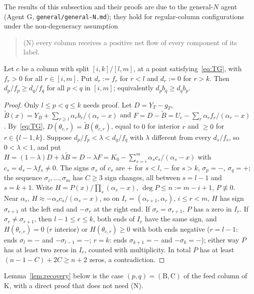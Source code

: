 \documentclass[11pt,a4paper]{report}
\begin{document}
The results of this subsection and their proofs are due to the general-$N$ agent (Agent G,
\texttt{general/general-N.md}); they hold for regular-column configurations under the non-degeneracy assumption
\begin{quote}
(N) every column receives a positive net flow of every component of its label.
\end{quote}

\begin{lemma}\label{lem:G1}
Let $c$ be a column with split $[i,k]/[l,m]$, at a point satisfying~\eqref{eq:TG}, with $f_r>0$ for all $r\in[i,m]$.
Put $d_r:=f_r$ for $r<l$ and $d_r:=0$ for $r>k$. Then $d_p/f_p\ge d_q/f_q$ for all $p<q$ in $[i,m]$; equivalently
$d_pb_q\ge d_qb_p$.
\end{lemma}
\begin{proof}
Only $l\le p<q\le k$ needs proof. Let $D=Y_T-g_T$, $\tilde B(x)=Y_B+\sum_{r\ge l}\alpha_rb_r/(\alpha_r-x)$ and
$F=D-\tilde B=U_c-\sum_r\alpha_rf_r/(\alpha_r-x)$. By~\eqref{eq:TG}, $D(\theta_{c,r})=\tilde B(\theta_{c,r})$, equal to $0$
for interior $r$ and $\ge0$ for $r\in\{l-1,k\}$. Suppose $d_p/f_p<\lambda<d_q/f_q$ with $\lambda$ different from every
$d_s/f_s$, so $0<\lambda<1$, and put $H=(1-\lambda)D+\lambda\tilde B=D-\lambda F=K_0-\sum_{s=i}^m\alpha_sc_s/(\alpha_s-x)$ with
$c_s=d_s-\lambda f_s\neq0$. The signs $\sigma_s$ of $c_s$ are $+$ for $s<l$, $-$ for $s>k$, $\sigma_p=-$, $\sigma_q=+$; the
sequence $\sigma_i,\dots,\sigma_m$ has $C\ge3$ sign changes, all between $s=l-1$ and $s=k+1$. Write
$H=P(x)/\prod_s(\alpha_s-x)$, $\deg P\le n:=m-i+1$, $P\not\equiv0$. Near $\alpha_s$, $H\approx-\alpha_sc_s/(\alpha_s-x)$, so
on $I_r=(\alpha_{r+1},\alpha_r)$, $i\le r<m$, $H$ has sign $\sigma_{r+1}$ at the left end and $-\sigma_r$ at the right end. If
$\sigma_r=\sigma_{r+1}$, $P$ has a zero in $I_r$. If $\sigma_r\neq\sigma_{r+1}$, then $l-1\le r\le k$, both ends of $I_r$ have
the same sign, and $H(\theta_{c,r})=0$ ($r$ interior) or $H(\theta_{c,r})\ge0$ with both ends negative ($r=l-1$: ends
$\sigma_l=-$ and $-\sigma_{l-1}=-$; $r=k$: ends $\sigma_{k+1}=-$ and $-\sigma_k=-$); either way $P$ has at least two zeros in
$I_r$, counted with multiplicity. In total $P$ has at least $(n-1-C)+2C\ge n+2$ zeros, a contradiction.
\end{proof}

Lemma~\ref{lem:recovery} below is the case $(p,q)=(\mathrm B,\mathrm C)$ of the feed column of K, with a direct proof
that does not need (N).
\end{document}
